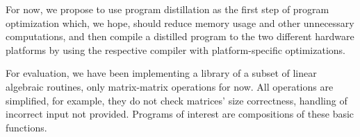 For now, we propose to use program distillation as the first step of program optimization which, we hope, should reduce memory usage and other unnecessary computations, and then compile a distilled program to the two different hardware platforms by using the respective compiler with platform-specific optimizations.

For evaluation, we have been implementing a library of a subset of linear algebraic routines, only matrix-matrix operations for now. All operations are simplified, for example, they do not check matrices' size correctness, handling of incorrect input not provided. Programs of interest are compositions of these basic functions.
